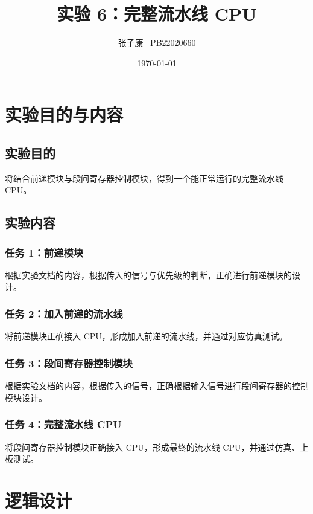 \documentclass[12pt,a4paper]{ctexart}
\title{实验 6：完整流水线 CPU}
\author{张子康 \ PB22020660}
\date{\today}
\begin{document}
\maketitle
\newpage
\section{实验目的与内容}
\subsection{实验目的}
将结合前递模块与段间寄存器控制模块，得到一个能正常运行的完整流水线 CPU。
\subsection{实验内容}
\subsubsection{任务 1：前递模块}
根据实验文档的内容，根据传入的信号与优先级的判断，正确进行前递模块的设计。
\subsubsection{任务 2：加入前递的流水线}
将前递模块正确接入 CPU，形成加入前递的流水线，并通过对应仿真测试。
\subsubsection{任务 3：段间寄存器控制模块}
根据实验文档的内容，根据传入的信号，正确根据输入信号进行段间寄存器的控制模块设计。
\subsubsection{任务 4：完整流水线 CPU}
将段间寄存器控制模块正确接入 CPU，形成最终的流水线 CPU，并通过仿真、上板测试。
\section{逻辑设计}
\end{document}
